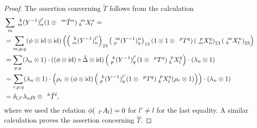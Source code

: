 \begin{proof}
 The assertion converning $\check{T}$ follows
  from the calculation
  \begin{align*}
    &\sum_{m} \Gr{(Y^{-1})}{k}{l'}{m}{n}(1 \otimes
    \Gru{\check{T}}{m}{n})\Gr{X}{m}{n}{k}{l} = \\
    &=\sum_{m,p,q} (\phi \otimes \id \otimes
    \id)\left(\left(\Gr{(Y^{-1})}{k}{l'}{m}{n}\right)_{23}
      \left(\Gr{(Y^{-1})}{m}{n}{p}{q}\right)_{13}(1 \otimes 1 \otimes
      \Gru{T}{p}{q})\left(\Gr{X}{p}{q}{m}{n}\right)_{13}\left(\Gr{X}{m}{n}{k}{l}\right)_{23}\right)
    \\
    &= \sum_{p,q} (\lambda_{n} \otimes 1) \cdot ((\phi \otimes \id)
    \circ \tilde \Delta \otimes \id)\left(\Gr{(Y^{-1})}{k}{l'}{p}{q}(1
      \otimes \Gru{T}{p}{q})\Gr{X}{p}{q}{k}{l}\right) \cdot
    (\lambda_{n} \otimes 1)
    \\
    &= \sum_{r,p,q} (\lambda_{n} \otimes 1) \cdot \left(\rho_{r}
      \otimes (\phi \otimes \id)\left(\Gr{(Y^{-1})}{k}{l'}{p}{q}(1 
      \otimes \Gru{T}{p}{q})\Gr{X}{p}{q}{k}{l}(\rho_{r} \otimes
      1)\right)\right) \cdot (\lambda_{n} \otimes 1) \\
  &= \delta_{l,l'}\lambda_{n}\rho_{l} \otimes \Gru{\check{T}}{k}{l},
  \end{align*}
  where we used the relation $\phi(\Grd{A}{l'}{l})=0$ for $l'\neq l$
  for the last equality. A similar calculation proves the assertion
  concerning $\hat{T}$. 
\end{proof}


